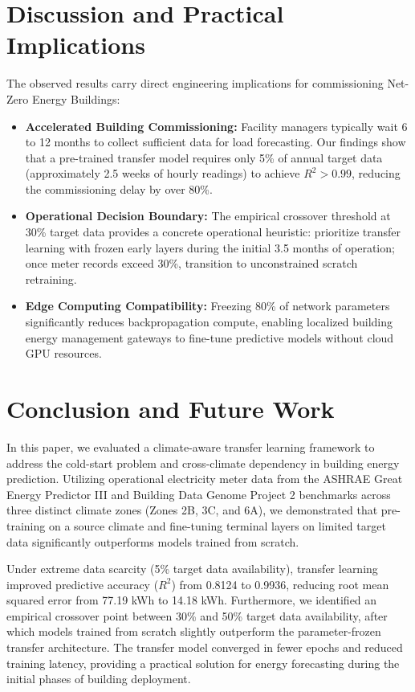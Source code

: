 \documentclass[conference]{IEEEtran}
\begin{document}
\section{Discussion and Practical Implications}
The observed results carry direct engineering implications for commissioning Net-Zero Energy Buildings:
\begin{itemize}
    \item \textbf{Accelerated Building Commissioning:} Facility managers typically wait 6 to 12 months to collect sufficient data for load forecasting. Our findings show that a pre-trained transfer model requires only 5\% of annual target data (approximately 2.5 weeks of hourly readings) to achieve $R^2 > 0.99$, reducing the commissioning delay by over 80\%.
    \item \textbf{Operational Decision Boundary:} The empirical crossover threshold at 30\% target data provides a concrete operational heuristic: prioritize transfer learning with frozen early layers during the initial 3.5 months of operation; once meter records exceed 30\%, transition to unconstrained scratch retraining.
    \item \textbf{Edge Computing Compatibility:} Freezing 80\% of network parameters significantly reduces backpropagation compute, enabling localized building energy management gateways to fine-tune predictive models without cloud GPU resources.
\end{itemize}

\section{Conclusion and Future Work}
In this paper, we evaluated a climate-aware transfer learning framework to address the cold-start problem and cross-climate dependency in building energy prediction. Utilizing operational electricity meter data from the ASHRAE Great Energy Predictor III and Building Data Genome Project 2 benchmarks across three distinct climate zones (Zones 2B, 3C, and 6A), we demonstrated that pre-training on a source climate and fine-tuning terminal layers on limited target data significantly outperforms models trained from scratch. 

Under extreme data scarcity (5\% target data availability), transfer learning improved predictive accuracy ($R^2$) from 0.8124 to 0.9936, reducing root mean squared error from 77.19 kWh to 14.18 kWh. Furthermore, we identified an empirical crossover point between 30\% and 50\% target data availability, after which models trained from scratch slightly outperform the parameter-frozen transfer architecture. The transfer model converged in fewer epochs and reduced training latency, providing a practical solution for energy forecasting during the initial phases of building deployment.
\end{document}
